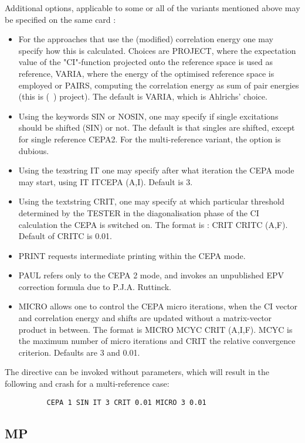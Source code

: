 \documentclass[11pt,fleqn]{article}
\begin{document}
Additional options, applicable to some or all of the variants 
mentioned above may be specified on the same card :
\begin{itemize}
\item For the approaches that use the (modified) correlation energy
      one may specify how this is calculated. Choices are PROJECT,
      where the expectation value of the "CI"-function projected onto
      the reference space is used as reference, VARIA, where
      the energy of the optimised reference space is employed or
      PAIRS, computing the correlation energy as sum of pair energies
      (this is (~) project).
      The default is VARIA, which is Ahlrichs' choice.
\item Using the keywords SIN or NOSIN, one may specify if single
      excitations should be shifted (SIN) or not. The default is
      that singles are shifted, except for single reference CEPA2.
      For the multi-reference variant, the option is dubious.
\item Using the texstring IT one may specify
      after what iteration the CEPA mode may start, using 
      IT ITCEPA (A,I).  Default is 3.
\item Using the textstring CRIT, one may specify at which 
      particular threshold determined by the TESTER in the
      diagonalisation phase of the CI calculation the CEPA is switched
      on. The format is : CRIT CRITC (A,F). Default of CRITC is 0.01.
\item PRINT requests intermediate printing within the CEPA mode.
\item PAUL refers only to the CEPA 2 mode, and invokes an 
      unpublished EPV correction formula due to P.J.A. Ruttinck.
\item MICRO allows one to control the CEPA micro iterations, when
      the CI vector and correlation energy and shifts are updated
      without a matrix-vector product in between. The format is
      MICRO MCYC CRIT (A,I,F). MCYC is the maximum number of micro
      iterations and CRIT the relative convergence criterion.
      Defaults are  3 and 0.01.
\end{itemize}

The directive can be invoked without parameters, which will result 
in the following and crash for a multi-reference case:
{
\footnotesize
\begin{verbatim}
          CEPA 1 SIN IT 3 CRIT 0.01 MICRO 3 0.01 
\end{verbatim}
}

\subsection[MP]{MP}
\end{document}
